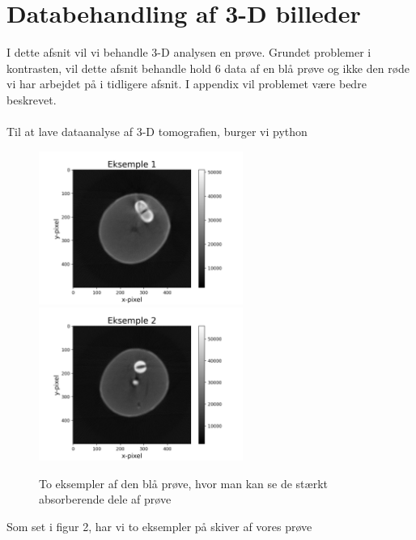 \documentclass[a4paper,twoside]{article}
\begin{document}
\section{Databehandling af 3-D billeder} 
I dette afsnit vil vi behandle 3-D analysen en prøve. Grundet problemer i kontrasten, vil dette afsnit behandle hold 6 data af en blå prøve og ikke den røde vi har arbejdet på i tidligere afsnit. I appendix vil problemet være bedre beskrevet. \\
\\
Til at lave dataanalyse af 3-D tomografien, burger vi python
\begin{figure}[H]
\begin{centering}
\includegraphics[height=5cm]{eks1_af_objekt_hold6.png}
\includegraphics[height=5cm]{eks2_af_objekt_hold6.png}
\hspace{1cm}
\par\end{centering}
\caption{\label{cap:2ien} To eksempler af den blå prøve, hvor man kan se de stærkt absorberende dele af prøve}
\end{figure}
Som set i figur 2, har vi to eksempler på skiver af vores prøve
\end{document}
